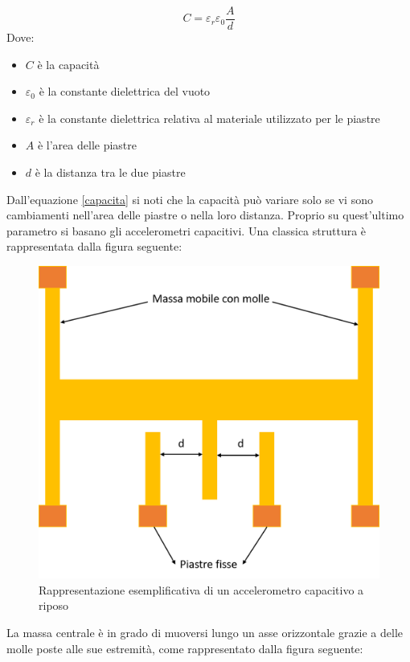 \begin{equation}
\label{capacita}
C = \varepsilon_r \varepsilon_0 \dfrac{A}{d} 
\end{equation}
Dove:
\begin{itemize}
	\item $C$ è la capacità
	\item $\varepsilon_0$ è la constante dielettrica del vuoto
	\item $\varepsilon_r$ è la constante dielettrica relativa al materiale utilizzato per le piastre
	\item $A$ è l'area delle piastre
	\item $d$ è la distanza tra le due piastre
\end{itemize}
Dall'equazione \ref{capacita} si noti che la capacità può variare solo se vi sono cambiamenti nell'area delle piastre o nella loro distanza. Proprio su quest'ultimo parametro si basano gli accelerometri capacitivi. Una classica struttura è rappresentata dalla figura seguente:
 \begin{figure}[H]  
	\centering 
	\includegraphics[scale=0.25 ]{tecnologie/acc1.png}
	\caption{Rappresentazione esemplificativa di un accelerometro capacitivo a riposo}
	\label{fig:acc1}
\end{figure}
La massa centrale è in grado di muoversi lungo un asse orizzontale grazie a delle molle poste alle sue estremità, come rappresentato dalla figura seguente:
